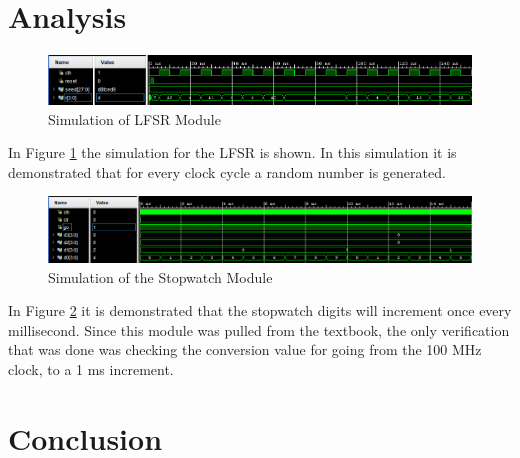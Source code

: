 \documentclass[11pt]{article}
\begin{document}
\section{Analysis}
\begin{figure}[H]
	\includegraphics [width=7in]{lfsr_sim.png}
	\centering
	\caption{Simulation of LFSR Module}
	\label{fig:lfsr_sim}
\end{figure}

In Figure \ref{fig:lfsr_sim} the simulation for the LFSR is shown. In this simulation it is demonstrated that for every clock cycle a random number is generated.

\begin{figure}[H]
	\includegraphics [width=7in]{stopwatch_sim.png}
	\centering
	\caption{Simulation of the Stopwatch Module}
	\label{fig:stopwatch_sim}
\end{figure}

In Figure \ref{fig:stopwatch_sim} it is demonstrated that the stopwatch digits will increment once every millisecond. Since this module was pulled from the textbook, the only verification that was done was checking the conversion value for going from the 100 MHz clock, to a 1 ms increment.

\section{Conclusion}
\end{document}
